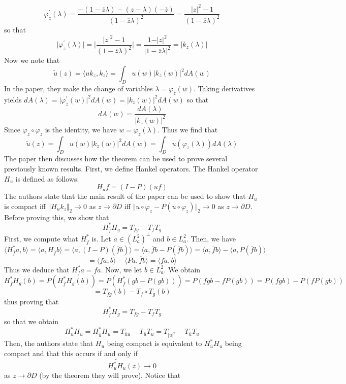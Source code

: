\documentclass[12pt]{article}
\begin{document}
\[
\varphi_z^\prime(\lambda) = \frac{-(1-\overline{z}\lambda) - (z-\lambda)(-\overline{z})}{(1-\overline{z}\lambda)^2} = \frac{\vert z \vert^2 - 1}{(1-\overline{z}\lambda)^2}
\] so that
\[
\vert \varphi_z^\prime(\lambda) \vert = \bigg\vert \frac{\vert z \vert^2 - 1}{(1-\overline{z}\lambda)^2} \bigg \vert = \frac{1-\vert z \vert^2}{\vert 1 - \overline{z}\lambda \vert^2} = \vert k_z(\lambda) \vert  
\] Now we note that
\[
\tilde{u}(z) = \langle uk_z, k_z \rangle = \int_D u(w) \vert k_z(w) \vert^2 dA(w)
\] In the paper, they make the change of variables $\lambda = \varphi_z(w)$. Taking derivatives yields $dA(\lambda) = \vert \varphi_z^\prime(w) \vert^2 dA(w) = \vert k_z(w) \vert^2 dA(w)$ so that
\[
dA(w) = \frac{dA(\lambda)}{\vert k_z(w) \vert^2}
\] Since $\varphi_z \circ \varphi_z$ is the identity, we have $w = \varphi_z(\lambda)$. Thus we find that
\[
\tilde{u}(z) = \int_D u(w) \vert k_z(w) \vert^2 dA(w) = \int_D u(\varphi_z(\lambda)) dA(\lambda)
\] The paper then discusses how the theorem can be used to prove several previously known results. First, we define Hankel operators. The Hankel operator $H_u$ is defined as follows: 
\[
H_u f = (I - P)(uf)
\] The authors state that the main result of the paper can be used to show that $H_u$ is compact iff $\Vert H_u k_z \Vert_2 \rightarrow 0$ as $z \rightarrow \partial{D}$ iff $\Vert u \circ \varphi_z - P(u \circ \varphi_z) \Vert_2 \rightarrow 0$ as $z \rightarrow \partial{D}$. Before proving this, we show that
\[
H_{\overline{f}}^* H_g = T_{fg} - T_f T_g
\] First, we compute what $H_{\overline{f}}^*$ is. Let $a \in (L_a^2)^\perp$ and $b \in L_a^2$. Then, we have
\[
\langle H_{\overline{f}}^*a, b \rangle = \langle a, H_{\overline{f}} b \rangle = \langle a, (I-P)(\overline{f}b) \rangle = \langle a, \overline{f}b - P(\overline{f}b) \rangle = \langle a, \overline{f}b \rangle - \langle a,  P(\overline{f}b)\rangle 
\]
\[
= \langle fa, b \rangle - \langle Pa, \overline{f}b \rangle = \langle fa, b \rangle
\] Thus we deduce that $H_{\overline{f}}^*a = fa$. Now, we let $b \in L_a^2$. We obtain
\[
H_{\overline{f}}^* H_g(b) = P(H_{\overline{f}}^* H_g(b)) = P(H_{\overline{f}}^*(gb - P(gb))) = P(fgb - fP(gb)) = P(fgb) - P(fP(gb)) 
\]
\[
= T_{fg}(b) - T_f \circ T_g(b)
\] thus proving that 
\[
H_{\overline{f}}^* H_g = T_{fg} - T_f T_g
\] so that we obtain
\[
H_u^* H_u = H_{\overline{\overline{u}}}^* H_u = T_{\overline{u}u} - T_{\overline{u}} T_u = T_{\vert u \vert^2} - T_{\overline{u}}T_u
\] Then, the authors state that $H_u$ being compact is equivalent to $H_u^* H_u$ being compact and that this occurs if and only if 
\[
\widetilde{H_u^* H_u}(z) \rightarrow 0 
\] as $z \rightarrow \partial{D}$ (by the theorem they will prove). Notice that
\end{document}
